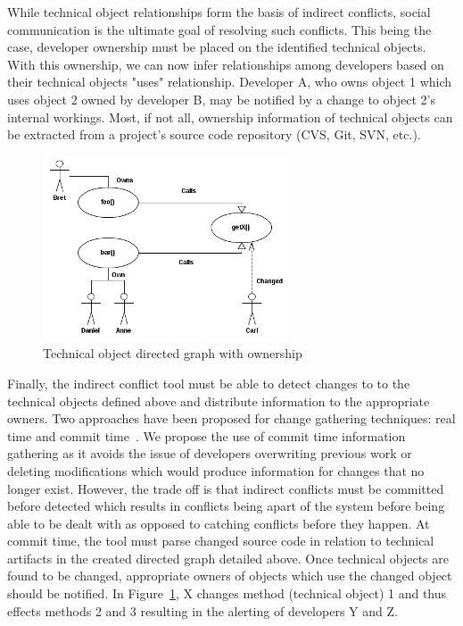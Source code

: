 \documentclass[conference]{IEEEtran}
\begin{document}
While technical object relationships form the basis of indirect conflicts,
social communication is the ultimate goal of resolving such conflicts.
This being the case, developer ownership must be placed on the 
identified technical objects. With this ownership, we can now infer
relationships among developers based on their technical objects
"uses" relationship. Developer A, who owns object 1 which uses 
object 2 owned by developer B, may be notified by a change to
object 2's internal workings. Most, if not all, ownership information
of technical objects can be extracted from a project's source code
repository (CVS, Git, SVN, etc.).\\

\begin{figure}[t!]
\includegraphics{images/CallGraph}
\caption{Technical object directed graph with ownership\label{fig:graph}}
\end{figure}

Finally, the indirect conflict tool must be able to detect changes to
to the technical objects defined above and distribute information 
to the appropriate owners. Two approaches have been 
proposed for change gathering techniques: real time and commit 
time~\cite{Fitzpatrick:2002:SPA}.
We propose the use of commit time
information gathering as it avoids the issue of developers 
overwriting previous work or deleting modifications which would 
produce information for changes that no longer exist. However, the
trade off is that indirect conflicts must be committed before detected
which results in conflicts being apart of the system before being able
to be dealt with as opposed to catching conflicts before they happen.
At commit time, the tool must parse changed source code in relation
to technical artifacts in the created directed graph detailed above.
Once technical objects are found to be changed, appropriate owners
of objects which use the changed object should be notified.
In Figure~\ref{fig:graph}, X changes method (technical object) 1
and thus effects methods 2 and 3 resulting in the alerting of
developers Y and Z.
\end{document}
